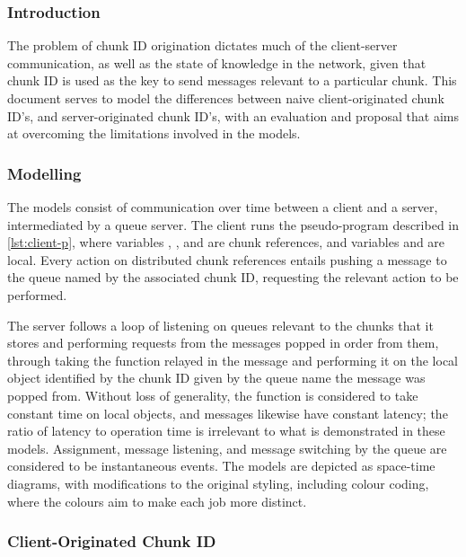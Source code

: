 \subsubsection{Introduction}

The problem of chunk ID origination 
dictates much of the client-server communication, as well as the state of
knowledge in the network, given that chunk ID is used as the key to send
messages relevant to a particular chunk.
This document serves to model the differences between naive client-originated
chunk ID's, and server-originated chunk ID's, with an evaluation and proposal
that aims at overcoming the limitations involved in the models.

\subsubsection{Modelling}\label{sec:cid-model}

The models consist of communication over time between a client and a server,
intermediated by a queue server.
The client runs the pseudo-program described in \cref{lst:client-p},
where variables , , and  are chunk references,
and variables  and  are local. 
Every action on distributed chunk references entails pushing a  message to the
queue named by the associated chunk ID, requesting the relevant action to be
performed.


The server follows a loop of listening on queues relevant to the chunks that it
stores and performing requests from the messages popped in order from them,
through taking the function relayed in the message and performing it on the
local object identified by the chunk ID given by the queue name the message was
popped from.
Without loss of generality, the function  is considered to take
constant time on local objects, and messages likewise have constant latency;
the ratio of latency to operation time is irrelevant to what is demonstrated in
these models.
Assignment, message listening, and message switching by the queue are
considered to be instantaneous events.
The models are depicted as space-time diagrams, with modifications to the
original styling\cite{lamport1978ordering}, including colour coding, where the
colours aim to make each job more distinct.

\subsubsection{Client-Originated Chunk ID}

